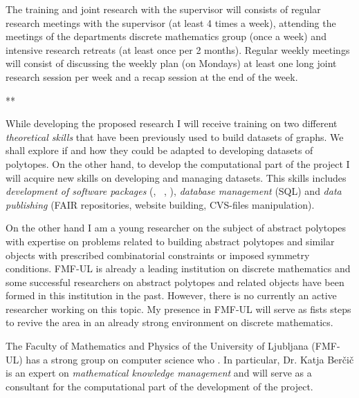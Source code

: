 The training and joint research with the supervisor will consists of regular research meetings with the supervisor (at least 4 times a week),
attending the meetings of the departments discrete mathematics group (once a week) and intensive research retreats (at least once per 2 months).
Regular weekly meetings will consist of discussing the weekly plan (on Mondays) at least one long joint research session per week 
and a recap session at the end of the week.


**

While developing the proposed research I will receive training on two different  \emph{theoretical skills} that have been previously used to build datasets of graphs.
We shall explore if and how they could be adapted to developing datasets of polytopes.
On the other hand, to develop the computational part of the project I will acquire new skills on developing and managing datasets.
This skills includes \emph{development of software packages} (\gap, \sage\ , \magma), \emph{database management} (SQL)  and \emph{data publishing} (FAIR repositories, website building, CVS-files manipulation).

On the other hand I am a young researcher on the subject of abstract polytopes with expertise on problems related to building abstract polytopes and similar objects with prescribed combinatorial constraints or imposed symmetry conditions.
FMF-UL is already a leading institution on discrete mathematics and some successful researchers on abstract polytopes and related objects have been formed in this institution in the past. However, there is no currently an active researcher working on this topic.
My presence in FMF-UL will serve as fists steps to revive the area in an already strong environment on discrete mathematics.

The Faculty of Mathematics and Physics of the University of Ljubljana (FMF-UL) has a strong group on computer science who .
In particular, Dr. Katja Berčič is an expert on \emph{mathematical knowledge management} and will serve as a consultant for the computational part of the development of the project.


